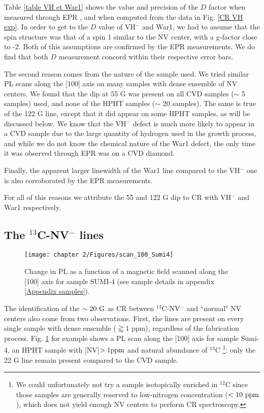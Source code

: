 \documentclass[a4paper, 11pt]{report}
\begin{document}
Table \ref{table VH et War1} shows the value and precision of the $D$ factor when measured through EPR \citep{cruddace2007magnetic}, and when computed from the data in Fig. \ref{CR VH exp}. In order to get to the $D$ value of VH$^-$ and War1, we had to assume that the spin structure was that of a spin 1 similar to the NV center, with a g-factor close to -2. Both of this assumptions are confirmed by the EPR measurements. We do find that both $D$ measurement concord within their respective error bars.

The second reason comes from the nature of the sample used. We tried similar PL scans along the [100] axis on many samples with dense ensemble of NV centers. We found that the dip at 55 G was present on all CVD samples ($\sim$ 5 samples) used, and none of the HPHT samples ($\sim$ 20 samples). The same is true of the 122 G line, except that it did appear on some HPHT samples, as will be discussed below. We know that the VH$^-$ defect is much more likely to appear in a CVD sample due to the large quantity of hydrogen used in the growth process, and while we do not know the chemical nature of the War1 defect, the only time it was observed through EPR was on a CVD diamond.

Finally, the apparent larger linewidth of the War1 line compared to the VH$^-$ one is also corroborated by the EPR measurements.

For all of this reasons we attribute the 55 and 122 G dip to CR with VH$^-$ and War1 respectively.

\subsection{The $^{13}$C-NV$^-$ lines}

\begin{figure}[h]
\centering
\texttt{[image: chapter 2/Figures/scan\_100\_Sumi4]}
\caption{Change in PL as a function of a magnetic field scanned along the [100] axis for sample SUMI-4 (see sample details in appendix \ref{Appendix samples}).}
\label{scan sumi 4}
\end{figure}

The identification of the $\sim 20\ \rm G$ as CR between $^{13}$C-NV$^-$ and ``normal" NV centers also come from two observations. First, the lines are present on every single sample with dense ensemble ($\gtrapprox 1$ ppm), regardless of the fabrication process. Fig. \ref{scan sumi 4} for example shows a PL scan along the [100] axis for sample Sumi-4, an HPHT sample with [NV]$>1 \rm ppm$ and natural abundance of $^{13}$C \footnote{We could unfortunately not try a sample isotopically enriched in $^{12}$C since those samples are generally reserved to low-nitrogen concentration ($< 10\ \rm ppm$), which does not yield enough NV centers to perform CR spectroscopy.}: only the 22 G line remain present compared to the CVD sample.
\end{document}
